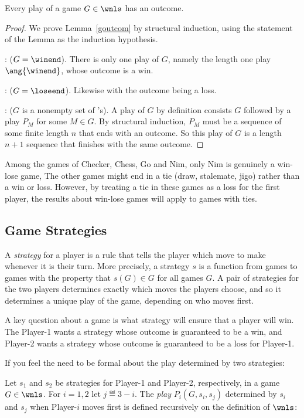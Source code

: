 \begin{definition}
\begin{lemma}\label{goutcom}
Every play of a game $G \in \wnls$ has an outcome.
\end{lemma}

\begin{proof}
We prove Lemma~\ref{goutcom} by structural induction, using the
statement of the Lemma as the induction hypothesis.

: ($G = \winend$).  There is only one play of
$G$, namely the length one play $\ang{\winend}$, whose outcome is a
win.

: ($G= \loseend$).  Likewise with the outcome
being a loss.

: ($G$ is a nonempty set of \wnls's).
A play of $G$ by definition consists $G$ followed by a play $P_M$ for
some $M \in G$.  By structural induction, $P_M$ must be a sequence of
some finite length $n$ that ends with an outcome.  So this play of $G$
is a length $n+1$ sequence that finishes with the same outcome.
\end{proof}

Among the games of Checker, Chess, Go and Nim, only Nim is genuinely a
win-lose game,   The other games might end in a tie (draw, stalemate,
jigo) rather than a win or loss.  However, by treating a tie in these
games as a loss for the first player, the results about win-lose games
will apply to games with ties.

\subsection{Game Strategies}

A \emph{strategy} for a player is a rule that tells the player which
move to make whenever it is their turn.  More precisely, a strategy
$s$ is a function from games to games with the property that $s(G) \in
G$ for all games $G$.  A pair of strategies for the two players
determines exactly which moves the players choose, and so it
determines a unique play of the game, depending on who moves first.

A key question about a game is what strategy will ensure that a player
will win.  The Player-1 wants a strategy whose outcome is guaranteed
to be a win, and Player-2 wants a strategy whose outcome is guaranteed
to be a loss for Player-1. 

\begin{staffnotes}
If you feel the need to be formal about the play determined by two
strategies:
\begin{definition*}
Let $s_1$ and $s_2$ be strategies for Player-1 and Player-2,
respectively, in a game $G \in \wnls$.  For $i=1,2$ let $j \eqdef
3-i$.  The \emph{play} $P_i(G,s_i,s_j)$ determined by $s_i$ and $s_j$
when Player-$i$ moves first is defined recursively on the definition
of $\wnls$:


\end{definition*}
\end{staffnotes}
\end{definition}
